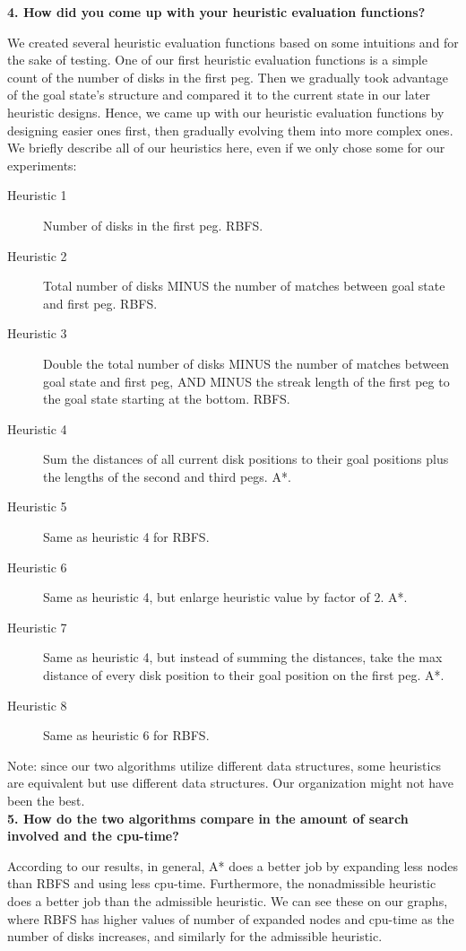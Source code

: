 \textbf{4. How did you come up with your heuristic evaluation functions?}

We created several heuristic evaluation functions based on some intuitions and for the sake of testing. One of our first heuristic evaluation functions is a simple count of the number of disks in the first peg. Then we gradually took advantage of the goal state's structure and compared it to the current state in our later heuristic designs. Hence, we came up with our heuristic evaluation functions by designing easier ones first, then gradually evolving them into more complex ones. We briefly describe all of our heuristics here, even if we only chose some for our experiments:

\begin{description}
	\item[Heuristic 1] Number of disks in the first peg. RBFS.
	\item[Heuristic 2] Total number of disks MINUS the number of matches between goal state and first peg. RBFS.
	\item[Heuristic 3] Double the total number of disks MINUS the number of matches between goal state and first peg, AND MINUS the streak length of the first peg to the goal state starting at the bottom. RBFS.
	\item[Heuristic 4] Sum the distances of all current disk positions to their goal positions plus the lengths of the second and third pegs. A*.
	\item[Heuristic 5] Same as heuristic 4 for RBFS.
	\item[Heuristic 6] Same as heuristic 4, but enlarge heuristic value by factor of 2. A*. 
	\item[Heuristic 7] Same as heuristic 4, but instead of summing the distances, take the max distance of every disk position to their goal position on the first peg. A*.
	\item[Heuristic 8] Same as heuristic 6 for RBFS.
\end{description}

Note: since our two algorithms utilize different data structures, some heuristics are equivalent but use different data structures. Our organization might not have been the best.\\

\textbf{5. How do the two algorithms compare in the amount of search involved and the cpu-time?}

According to our results, in general, A* does a better job by expanding less nodes than RBFS and using less cpu-time. Furthermore, the nonadmissible heuristic does a better job than the admissible heuristic. We can see these on our graphs, where RBFS has higher values of number of expanded nodes and cpu-time as the number of disks increases, and similarly for the admissible heuristic.\\

